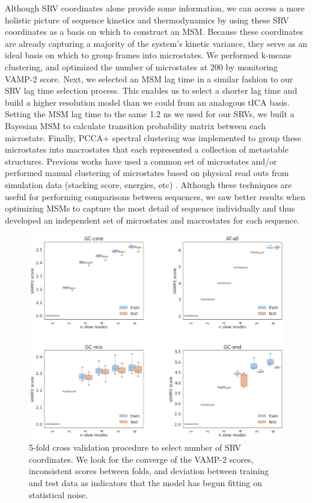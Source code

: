 \documentclass[journal=jpcbfk,manuscript=article]{achemso}
\begin{document}
Although SRV coordinates alone provide some information, we can access a more holistic picture of sequence kinetics and thermodynamics by using these SRV coordinates as a basis on which to construct an MSM. Because these coordinates are already capturing a majority of the system's kinetic variance, they serve as an ideal basis on which to group frames into microstates. We performed k-means clustering, and optimized the number of microstates at 200 by monitoring VAMP-2 score. Next, we selected an MSM lag time in a similar fashion to our SRV lag time selection process. This enables us to select a shorter lag time and build a higher resolution model than we could from an analogous tICA basis. Setting the MSM lag time to the same 1.2 ns we used for our SRVs, we built a Bayesian MSM to calculate transition probability matrix between each microstate. Finally, PCCA+ spectral clustering was implemented to group these microstates into macrostates that each represented a collection of metastable structures. Previous works have used a common set of microstates and/or performed manual clustering of microstates based on physical read outs from simulation data (stacking score, energies, etc) \citep{Pinamonti2017PredictingModels, PinamontiTheModels}. Although these techniques are useful for performing comparisons between sequences, we saw better results when optimizing MSMs to capture the most detail of sequence individually and thus developed an independent set of microstates and macrostates for each sequence. 

\begin{figure}[ht!]
	\begin{center}
        \includegraphics[width=120mm, 
        scale=0.5]{Figs/figs_imp/allseq_crossval.png}
        \caption{5-fold cross validation procedure to select number of SRV coordinates. We look for the converge of the VAMP-2 scores, inconsistent scores between folds, and deviation between training and test data as indicators that the model has begun fitting on statistical noise.}
        \label{fig:allseq_srv_crossval}
	\end{center}
\end{figure}
\end{document}
